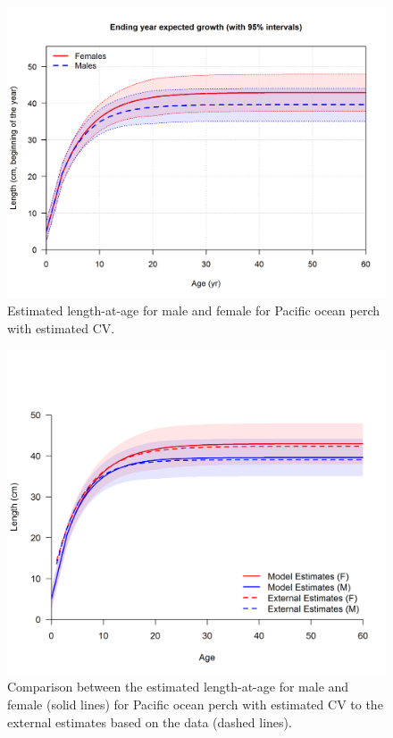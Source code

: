 \documentclass[12pt,]{article}
\begin{document}
\FloatBarrier

\begin{figure}
\centering
\includegraphics{r4ss/plots_mod1/bio1_sizeatage.png}
\caption{Estimated length-at-age for male and female for Pacific ocean
perch with estimated CV. \label{fig:sizeatage}}
\end{figure}

\FloatBarrier 

\begin{figure}
\centering
\includegraphics{Figures/Growth_Estimate_Comparison.png}
\caption{Comparison between the estimated length-at-age for male and
female (solid lines) for Pacific ocean perch with estimated CV to the
external estimates based on the data (dashed lines).
\label{fig:length_compare}}
\end{figure}
\end{document}
